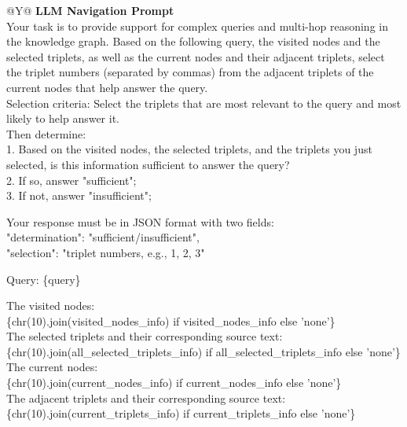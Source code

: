 \documentclass{article}
\theoremstyle{plain}
\theoremstyle{definition}
\theoremstyle{remark}
\begin{document}
\begin{table}[htb]
  \centering
  \caption{LLM Navigation Prompt}
  \label{tab:llm_navigation}
  \begin{tabularx}{\textwidth}{@{}Y@{}}
    \toprule
    \textbf{LLM Navigation Prompt} \\     %
    \midrule
    Your task is to provide support for complex queries and multi-hop reasoning in the knowledge graph.
    Based on the following query, the visited nodes and the selected triplets, as well as the current nodes and their adjacent triplets,
    select the triplet numbers (separated by commas) from the adjacent triplets of the current nodes that help answer the query.\\
    
    Selection criteria: Select the triplets that are most relevant to the query and most likely to help answer it.\\

    Then determine:\\
    1. Based on the visited nodes, the selected triplets, and the triplets you just selected, is this information sufficient to answer the query?\\
    2. If so, answer "sufficient";\\
    3. If not, answer "insufficient";\\

    \par\medskip
    Your response must be in JSON format with two fields:\\
    "determination": "sufficient/insufficient",\\
    "selection": "triplet numbers, e.g., 1, 2, 3"\\

    \par\medskip
    Query: \{query\} \\

    \par\medskip
    The visited nodes:\\
    \{chr(10).join(visited\_nodes\_info) if visited\_nodes\_info else 'none'\} \\

    The selected triplets and their corresponding source text:\\
    \{chr(10).join(all\_selected\_triplets\_info) if all\_selected\_triplets\_info else 'none'\} \\

    The current nodes:\\
    \{chr(10).join(current\_nodes\_info) if current\_nodes\_info else 'none'\} \\

    The adjacent triplets and their corresponding source text:\\
    \{chr(10).join(current\_triplets\_info) if current\_triplets\_info else 'none'\} \\
    \bottomrule
  \end{tabularx}
\end{table}
\end{document}
